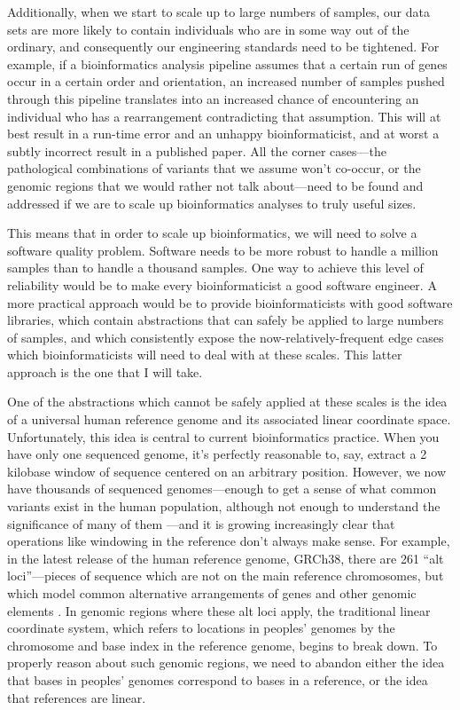 \documentclass[11pt,proposal]{ucthesis}
\begin{document}
Additionally, when we start to scale up to large numbers of samples, our data sets are more likely to contain individuals who are in some way out of the ordinary, and consequently our engineering standards need to be tightened. For example, if a bioinformatics analysis pipeline assumes that a certain run of genes occur in a certain order and orientation, an increased number of samples pushed through this pipeline translates into an increased chance of encountering an individual who has a rearrangement contradicting that assumption. This will at best result in a run-time error and an unhappy bioinformaticist, and at worst a subtly incorrect result in a published paper. All the corner cases---the pathological combinations of variants that we assume won't co-occur, or the genomic regions that we would rather not talk about---need to be found and addressed if we are to scale up bioinformatics analyses to truly useful sizes.

This means that in order to scale up bioinformatics, we will need to solve a software quality problem. Software needs to be more robust to handle a million samples than to handle a thousand samples. One way to achieve this level of reliability would be to make every bioinformaticist a good software engineer. A more practical approach would be to provide bioinformaticists with good software libraries, which contain abstractions that can safely be applied to large numbers of samples, and which consistently expose the now-relatively-frequent edge cases which bioinformaticists will need to deal with at these scales. This latter approach is the one that I will take.

One of the abstractions which cannot be safely applied at these scales is the idea of a universal human reference genome and its associated linear coordinate space. Unfortunately, this idea is central to current bioinformatics practice. When you have only one sequenced genome, it's perfectly reasonable to, say, extract a 2 kilobase window of sequence centered on an arbitrary position. However, we now have thousands of sequenced genomes---enough to get a sense of what common variants exist in the human population, although not enough to understand the significance of many of them \cite{10002010map}---and it is growing increasingly clear that operations like windowing in the reference don't always make sense. For example, in the latest release of the human reference genome, GRCh38, there are 261 ``alt loci''---pieces of sequence which are not on the main reference chromosomes, but which model common alternative arrangements of genes and other genomic elements \cite{karolchik2014new}. In genomic regions where these alt loci apply, the traditional linear coordinate system, which refers to locations in peoples' genomes by the chromosome and base index in the reference genome, begins to break down. To properly reason about such genomic regions, we need to abandon either the idea that bases in peoples' genomes correspond to bases in a reference, or the idea that references are linear.
\end{document}
